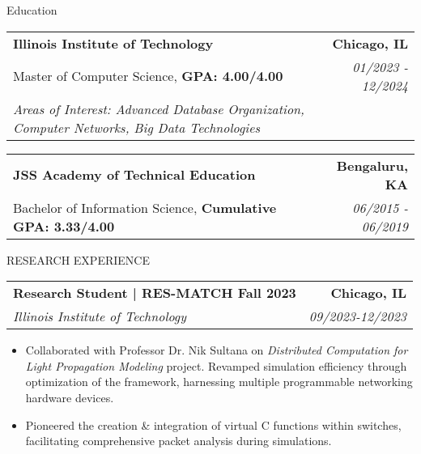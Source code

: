 \documentclass{resume} %
\begin{document}
\vspace{-10pt} %
\begin{rSection}{Education}
   \begin{tabularx}{\textwidth}{@{}X r}
   \textbf{Illinois Institute of Technology} & \textbf{Chicago, IL} \\
   \small Master of Computer Science, \textbf{GPA: 4.00/4.00} & \small \textit{01/2023 - 12/2024} \\
   \small \textit{Areas of Interest: Advanced Database Organization, Computer Networks, Big Data Technologies}
   \end{tabularx}
   
   \vspace{-3pt}

   \begin{tabularx}{\textwidth}{@{}X r}
   \textbf{JSS Academy of Technical Education} & \textbf{Bengaluru, KA} \\
   \small Bachelor of Information Science, \textbf{Cumulative GPA: 3.33/4.00} & \small \textit{06/2015 - 06/2019} \\
   \end{tabularx}
\end{rSection}

\vspace{-5pt} %
\begin{rSection}{RESEARCH EXPERIENCE}

   \begin{tabularx}{\textwidth}{@{}X r}
      \textbf{Research Student | RES-MATCH Fall 2023} & \textbf{Chicago, IL} \\
      \textit{Illinois Institute of Technology} & \textit{09/2023-12/2023} \\
   \end{tabularx}


   \begin{minipage}[t]{1\textwidth}
      \begin{itemize}[left=0pt, nosep, before=\vspace{-0.5\baselineskip}]
         \item \small Collaborated with Professor Dr. Nik Sultana on \textit{Distributed Computation for Light Propagation Modeling} project. Revamped simulation efficiency through optimization of the framework, harnessing multiple programmable networking hardware devices.
         \item \small Pioneered the creation \& integration of virtual C functions within switches, facilitating comprehensive packet analysis during simulations.
      \end{itemize}
   \end{minipage}


\end{rSection}
\end{document}

